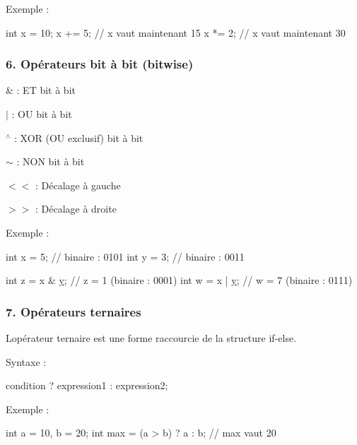 Exemple \+: 
\begin{DoxyCode}
\textcolor{keywordtype}{int} x = 10;
x += 5;   \textcolor{comment}{// x vaut maintenant 15}
x *= 2;   \textcolor{comment}{// x vaut maintenant 30}
\end{DoxyCode}


\subsubsection*{6. Opérateurs bit à bit (bitwise)}


\begin{DoxyItemize}
\item {\ttfamily \&} \+: ET bit à bit
\item {\ttfamily $\vert$} \+: OU bit à bit
\item {\ttfamily $^\wedge$} \+: X\+OR (OU exclusif) bit à bit
\item {\ttfamily $\sim$} \+: N\+ON bit à bit
\item {\ttfamily $<$$<$} \+: Décalage à gauche
\item {\ttfamily $>$$>$} \+: Décalage à droite
\end{DoxyItemize}

Exemple \+: 
\begin{DoxyCode}
\textcolor{keywordtype}{int} x = 5;  \textcolor{comment}{// binaire : 0101}
\textcolor{keywordtype}{int} y = 3;  \textcolor{comment}{// binaire : 0011}

\textcolor{keywordtype}{int} z = x & \hyperlink{addition_8c_a0a2f84ed7838f07779ae24c5a9086d33}{y};  \textcolor{comment}{// z = 1  (binaire : 0001)}
\textcolor{keywordtype}{int} w = x | \hyperlink{addition_8c_a0a2f84ed7838f07779ae24c5a9086d33}{y};  \textcolor{comment}{// w = 7  (binaire : 0111)}
\end{DoxyCode}


\subsubsection*{7. Opérateurs ternaires}

L\textquotesingle{}opérateur ternaire est une forme raccourcie de la structure {\ttfamily if-\/else}.

Syntaxe \+: 
\begin{DoxyCode}
condition ? expression1 : expression2;
\end{DoxyCode}


Exemple \+: 
\begin{DoxyCode}
\textcolor{keywordtype}{int} a = 10, b = 20;
\textcolor{keywordtype}{int} max = (a > b) ? a : b;  \textcolor{comment}{// max vaut 20}
\end{DoxyCode}
 